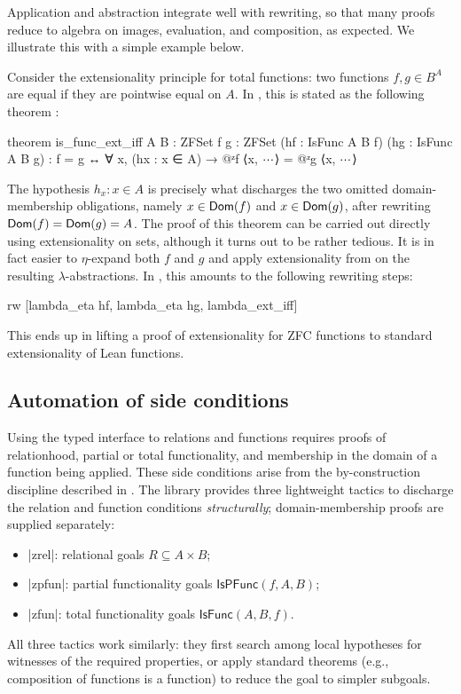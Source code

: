 Application and abstraction integrate well with rewriting, so that many proofs reduce to algebra on images, evaluation, and composition, as expected.
We illustrate this with a simple example below.

\begin{example}
  \label{ex:func-ext}
  Consider the extensionality principle for total functions: two functions $f,g\in B^A$ are equal if they are pointwise equal on $A$.
  In \zflean, this is stated as the following theorem {\small{}}:
  \begin{leanlisting}
theorem is_func_ext_iff {A B : ZFSet} {f g : ZFSet}
  (hf : IsFunc A B f) (hg : IsFunc A B g) :
    f = g ↔ ∀ x, (hx : x ∈ A) → @ᶻf ⟨x, $\irrelprf$⟩ = @ᶻg ⟨x, $\irrelprf$⟩
  \end{leanlisting}
  The hypothesis $h_x : x\in A$ is precisely what discharges the two omitted domain-membership obligations, namely $x\in\mathsf{Dom}(f)$ and $x\in\mathsf{Dom}(g)$, after rewriting $\mathsf{Dom}(f)=\mathsf{Dom}(g)=A$.
  The proof of this theorem can be carried out directly using extensionality on sets, although it turns out to be rather tedious.
  It is in fact easier to $\eta$-expand both $f$ and $g$ and apply extensionality from  on the resulting $\lambda$-abstractions.
  In \zflean, this amounts to the following rewriting steps:
  \begin{leanlisting}
  rw [lambda_eta hf, lambda_eta hg, lambda_ext_iff]
  \end{leanlisting}
  This ends up in lifting a proof of extensionality for ZFC functions to standard extensionality of Lean functions.
\end{example}

\subsection{Automation of side conditions}
\label{subsec:zflean-automation}
Using the typed interface to relations and functions requires proofs of relationhood, partial or total functionality, and membership in the domain of a function being applied.
These side conditions arise from the by-construction discipline described in .
The library provides three lightweight tactics to discharge the relation and function conditions \emph{structurally}; domain-membership proofs are supplied separately:
\begin{itemize}
  \item \inlinelean|zrel|: relational goals $R\subseteq A\times B$;
  \item \inlinelean|zpfun|: partial functionality goals $\mathsf{IsPFunc}(f,A,B)$;
  \item \inlinelean|zfun|: total functionality goals $\mathsf{IsFunc}(A,B,f)$.
\end{itemize}
All three tactics work similarly: they first search among local hypotheses for witnesses of the required properties, or apply standard theorems (e.g., composition of functions is a function) to reduce the goal to simpler subgoals.

